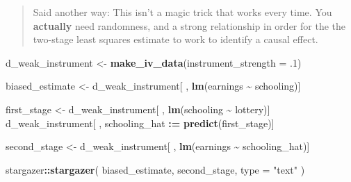 \documentclass[
]{article}
\newenvironment{Shaded}{\begin{snugshade}}{\end{snugshade}}
\newcommand{\AttributeTok}[1]{\textcolor[rgb]{0.13,0.29,0.53}{#1}}
\newcommand{\DecValTok}[1]{\textcolor[rgb]{0.00,0.00,0.81}{#1}}
\newcommand{\FunctionTok}[1]{\textcolor[rgb]{0.13,0.29,0.53}{\textbf{#1}}}
\newcommand{\NormalTok}[1]{#1}
\newcommand{\OtherTok}[1]{\textcolor[rgb]{0.56,0.35,0.01}{#1}}
\newcommand{\SpecialCharTok}[1]{\textcolor[rgb]{0.81,0.36,0.00}{\textbf{#1}}}
\newcommand{\StringTok}[1]{\textcolor[rgb]{0.31,0.60,0.02}{#1}}
\theoremstyle{definition}
\theoremstyle{definition}
\theoremstyle{definition}
\theoremstyle{definition}
\theoremstyle{remark}
\begin{document}
\begin{quote}
Said another way: This isn't a magic trick that works every time. You \textbf{actually} need randomness, and a strong relationship in order for the the two-stage least squares estimate to work to identify a causal effect.
\end{quote}

\begin{Shaded}
\begin{Highlighting}[]
\NormalTok{d\_weak\_instrument }\OtherTok{\textless{}{-}} \FunctionTok{make\_iv\_data}\NormalTok{(}\AttributeTok{instrument\_strength =}\NormalTok{ .}\DecValTok{1}\NormalTok{)}

\NormalTok{biased\_estimate }\OtherTok{\textless{}{-}}\NormalTok{ d\_weak\_instrument[ , }\FunctionTok{lm}\NormalTok{(earnings }\SpecialCharTok{\textasciitilde{}}\NormalTok{ schooling)]}

\NormalTok{first\_stage }\OtherTok{\textless{}{-}}\NormalTok{ d\_weak\_instrument[ , }\FunctionTok{lm}\NormalTok{(schooling }\SpecialCharTok{\textasciitilde{}}\NormalTok{ lottery)]}
\NormalTok{d\_weak\_instrument[ , schooling\_hat }\SpecialCharTok{:=} \FunctionTok{predict}\NormalTok{(first\_stage)]}

\NormalTok{second\_stage }\OtherTok{\textless{}{-}}\NormalTok{ d\_weak\_instrument[ , }\FunctionTok{lm}\NormalTok{(earnings }\SpecialCharTok{\textasciitilde{}}\NormalTok{ schooling\_hat)]}
\end{Highlighting}
\end{Shaded}

\begin{Shaded}
\begin{Highlighting}[]
\NormalTok{stargazer}\SpecialCharTok{::}\FunctionTok{stargazer}\NormalTok{(}
\NormalTok{  biased\_estimate, second\_stage, }
  \AttributeTok{type =} \StringTok{"text"}
\NormalTok{)}
\end{Highlighting}
\end{Shaded}
\end{document}
